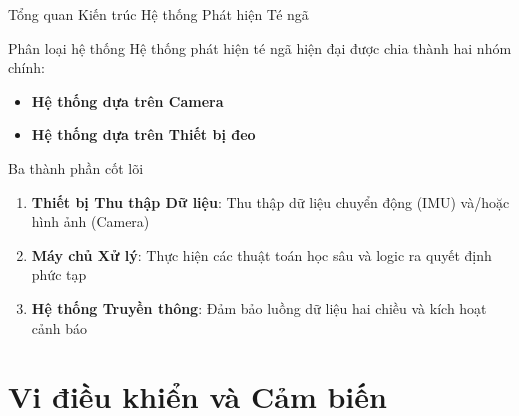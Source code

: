 \begin{frame}{Tổng quan Kiến trúc Hệ thống Phát hiện Té ngã}
\begin{block}{Phân loại hệ thống}
Hệ thống phát hiện té ngã hiện đại được chia thành hai nhóm chính:
\begin{itemize}
\item \textbf{Hệ thống dựa trên Camera}
\item \textbf{Hệ thống dựa trên Thiết bị đeo}
\end{itemize}
\end{block}

\begin{block}{Ba thành phần cốt lõi}
\begin{enumerate}
\item \textbf{Thiết bị Thu thập Dữ liệu}: Thu thập dữ liệu chuyển động (IMU) và/hoặc hình ảnh (Camera)
\item \textbf{Máy chủ Xử lý}: Thực hiện các thuật toán học sâu và logic ra quyết định phức tạp
\item \textbf{Hệ thống Truyền thông}: Đảm bảo luồng dữ liệu hai chiều và kích hoạt cảnh báo
\end{enumerate}
\end{block}
\end{frame}

\section{Vi điều khiển và Cảm biến}

